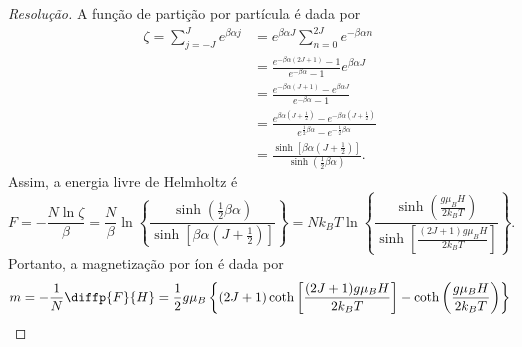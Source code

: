 \begin{proof}[Resolução]
    A função de partição por partícula é dada por
    \begin{align*}
        \zeta = \sum_{j = -J}^J e^{\beta \alpha j} &= e^{\beta \alpha J} \sum_{n=0}^{2J} e^{-\beta \alpha n}\\
                                                    &= \frac{e^{-\beta \alpha(2J + 1)} - 1}{e^{-\beta \alpha} - 1}e^{\beta \alpha J}\\
                                                    &= \frac{e^{-\beta \alpha(J+1)} - e^{\beta \alpha J}}{e^{-\beta \alpha} - 1}\\
                                                    &= \frac{e^{\beta \alpha \left(J + \frac12\right)} - e^{-\beta \alpha\left(J + \frac12\right)}}{e^{\frac12 \beta \alpha} - e^{-\frac12 \beta \alpha}}\\
                                                    &= \frac{\sinh\left[\beta \alpha \left(J + \frac12\right)\right]}{\sinh\left(\frac12\beta \alpha\right)}.
    \end{align*}
    Assim, a energia livre de Helmholtz é
    \begin{equation*}
        F = - \frac{N\ln \zeta}{\beta} = \frac{N}{\beta}\ln\left\{\frac{\sinh\left(\frac12 \beta \alpha\right)}{\sinh\left[\beta \alpha (J + \frac12)\right]}\right\} = N k_B T\ln\left\{\frac{\sinh\left(\frac{g \mu_B H}{2k_BT}\right)}{\sinh\left[\frac{(2J+1)g \mu_B H}{2k_BT}\right]}\right\}.
    \end{equation*}
    Portanto, a magnetização por íon é dada por
    \begin{equation*}
        m = -\frac{1}{N}\diffp{F}{H} = \frac12g \mu_B\left\{(2J + 1)\coth\left[\frac{(2J + 1)g \mu_B H}{2 k_B T}\right] - \coth\left(\frac{g \mu_B H}{2 k_B T}\right)\right\}
    \end{equation*}


\end{proof}
